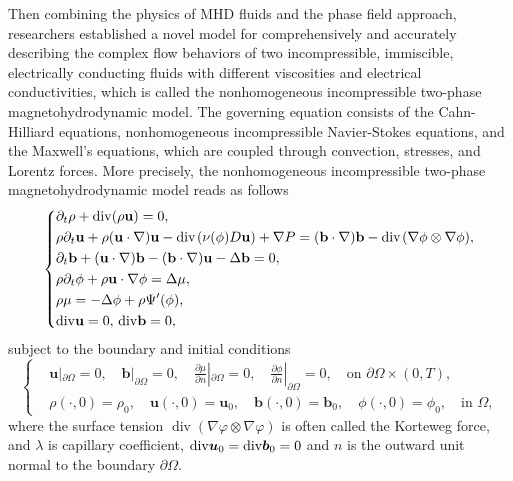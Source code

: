 \documentclass[11pt]{article}
\renewcommand{\div}{\mbox{\rm div}\;\!}
\newcommand{\Dv}{{\rm div}}
\numberwithin{equation}{section}
\begin{document}
Then combining the physics of MHD fluids and the phase field approach, researchers \cite{SZ,YMHYH} established a novel model for comprehensively and accurately describing the complex flow behaviors of two incompressible, immiscible, electrically conducting fluids with different viscosities and electrical conductivities, which  is called  the nonhomogeneous incompressible  two-phase magnetohydrodynamic model. The governing equation consists of the Cahn-Hilliard equations, nonhomogeneous incompressible Navier-Stokes equations, and the Maxwell's equations, which are coupled through convection,
stresses, and Lorentz forces. More precisely,  the nonhomogeneous incompressible two-phase magnetohydrodynamic model reads as follows
\begin{align} \label{1.1}
\left\{
\begin{aligned}
&\partial_{t}\rho+\Dv (\rho \mathbf{u})=0,\\
&\rho\partial_{t}\mathbf{u}+\rho(\mathbf{u}\cdot\nabla)\mathbf{u}
-\div(\nu(\phi)D\mathbf{u})+\nabla P
=(\mathbf{b}\cdot\nabla)\mathbf{b}-\div(\nabla\phi\otimes\nabla\phi),\\
&\partial_{t}\mathbf{b}+(\mathbf{u}\cdot\nabla)\mathbf{b}-(\mathbf{b}\cdot\nabla)\mathbf{u}
-\Delta \mathbf{b}=0, \\
&\rho\partial_{t}\phi+\rho\mathbf{u}\cdot\nabla\phi=\Delta\mu,\\
&\rho\mu=-\Delta\phi+\rho\Psi'(\phi),\\
&\Dv \mathbf{u}=0,\, \Dv \mathbf{b}=0,
\end{aligned}
\right.
\end{align}
subject to the boundary and initial conditions
\begin{equation}\label{1.2MHD}
\begin{cases}
&\mathbf{u}|_{\partial\Omega}=0, \quad \mathbf{b}|_{\partial\Omega}=0, \quad\frac{\partial\mu}{\partial n}
|_{\partial\Omega}=0, \quad \frac{\partial\phi}{\partial n}
|_{\partial\Omega}=0, \quad \text{on } \partial\Omega \times (0, T), \\
&\rho(\cdot, 0)=\rho_0, \quad \mathbf{u}(\cdot, 0)=\mathbf{u}_0, \quad \mathbf{b}(\cdot, 0)=\mathbf{b}_0, \quad \phi(\cdot, 0)=\phi_0, \quad \text{in } \Omega,
\end{cases}
\end{equation}
where the surface tension $\operatorname{div}(\nabla\varphi\otimes\nabla\varphi)$ is often called the Korteweg force, and $\lambda$ is capillary coefficient, $\Dv \boldsymbol{u}_0 = \Dv \boldsymbol{b}_0 = 0$ and $n$ is the outward unit normal to the boundary $\partial\Omega$.
\end{document}
